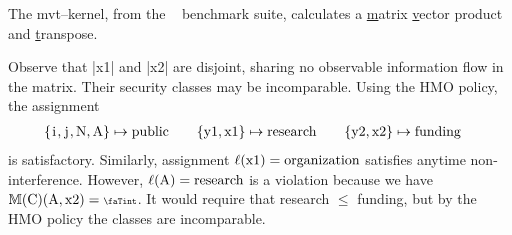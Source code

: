 \begin{example}
The mvt--kernel, from the ~\cite{polybench} 
benchmark suite, calculates a \underline{m}atrix \underline{v}ector product and
\underline{t}ranspose.

\begin{center}
\begin{minipage}{.55\textwidth}
\end{minipage}\hfill%
\begin{minipage}[b]{.40\textwidth}
\hfill\scalebox{.85}{$\begin{pNiceMatrix}[first-row,first-col]
& \prc|i|  & \prc|j| & \prc|N| & \prc|x1| & \prc|x2| & \prc|y1| & \prc|y2| & \prc|A| \\
\prc|i|   & \nv & \vi & \nv & \vi & \vi & \nv & \nv & \nv  \\
\prc|j|   & \nv & \nv & \nv & \vi & \vi & \nv & \nv & \nv  \\
\prc|N|   & \vi & \vi & \nv & \vi & \vi & \nv & \nv & \nv  \\
\prc|x1|  & \nv & \nv & \nv & \nv & \nv & \nv & \nv & \nv  \\
\prc|x2|  & \nv & \nv & \nv & \nv & \nv & \nv & \nv & \nv  \\
\prc|y1|  & \nv & \nv & \nv & \vi & \nv & \nv & \nv & \nv  \\
\prc|y2|  & \nv & \nv & \nv & \nv & \vi & \nv & \nv & \nv  \\
\prc|A|   & \nv & \nv & \nv & \vi & \vi & \nv & \nv & \nv  \\
\end{pNiceMatrix}$}
\end{minipage}
\end{center}

Observe that \prc|x1| and \prc|x2| are disjoint, sharing no observable
information flow in the matrix. Their security classes may be incomparable.
Using the HMO policy, the assignment
\begin{align*}
\{\prc|i|, \prc|j|, \prc|N|, \prc|A|\} &\mapsto \text{public} &&&
\{\prc|y1|, \prc|x1|\} & \mapsto \text{research} &&&
\{\prc|y2|, \prc|x2|\} & \mapsto \text{funding}
\end{align*}
is satisfactory.
Similarly, assignment \(\lvl{\prc|x1|} = \text{organization}\) satisfies anytime
non-interference. However, \(\lvl{\prc|A|} = \text{research}\) is a violation
because we have $\sfm{\prc|C|}(\prc|A|,\prc|x2|)=\vi$. It would require that
research $\leqslant$ funding, but by the HMO policy the classes are
incomparable.
 \end{example}

